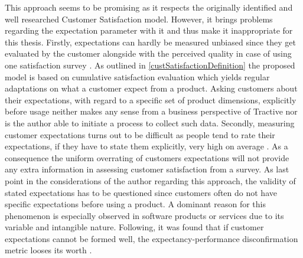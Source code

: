 This approach seems to be promising as it respects the originally identified and well researched Customer Satisfaction model. However, it brings problems regarding the expectation parameter with it and thus make it inappropriate for this thesis. Firstly, expectations can hardly be measured unbiased since they get evaluated by the customer alongside with the perceived quality in case of using one satisfaction survey \cite{getty1995relationship}. As outlined in \ref{custSatisfactionDefinition} the proposed model is based on cumulative satisfaction evaluation which yields regular adaptations on what a customer expect from a product. Asking customers about their expectations, with regard to a specific set of product dimensions, explicitly before usage neither makes any sense from a business perspective of Tractive nor is the author able to initiate a process to collect such data. Secondly, measuring customer expectations turns out to be difficult as people tend to rate their expectations, if they have to state them explicitly, very high on average \cite{babakus1992empirical}. As a consequence the uniform overrating of customers expectations will not provide any extra information in assessing customer satisfaction from a survey. As last point in the considerations of the author regarding this approach, the validity of stated expectations has to be questioned since customers often do not have specific expectations before using a product. A dominant reason for this phenomenon is especially observed in software products or services due to its variable and intangible nature. Following, it was found that if customer expectations cannot be formed well, the expectancy-performance disconfirmation metric looses its worth \cite{halstead1994multisource}. 

